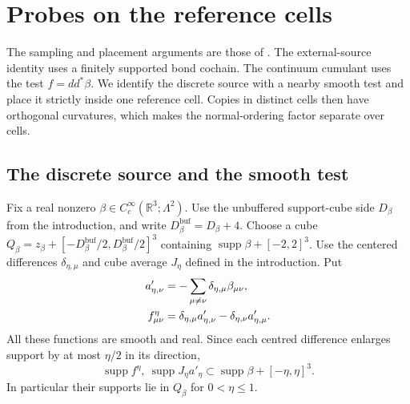 \documentclass[11pt,letterpaper,reqno]{amsart}
\newcommand{\R}{\mathbb R}
\DeclareMathOperator{\supp}{supp}
\begin{document}
\section{Probes on the reference cells}\label{sec:reference-cells}

The sampling and placement arguments are those of
\cite[\S19]{QED3Master}. The external-source identity uses a finitely supported bond cochain.
The continuum cumulant uses the test $f=dd^*\beta$. We identify the
discrete source with a nearby smooth test and place it strictly inside
one reference cell. Copies in distinct cells then have orthogonal
curvatures, which makes the normal-ordering factor separate over cells.

\subsection{The discrete source and the smooth test}

Fix a real nonzero $\beta\in C_c^\infty(\R^3;\Lambda^2)$.
Use the unbuffered support-cube side $D_\beta$ from the introduction,
and write
$D_\beta^{\mathrm{buf}}=D_\beta+4$. Choose a cube
$Q_\beta=z_\beta+[-D_\beta^{\mathrm{buf}}/2,
D_\beta^{\mathrm{buf}}/2]^3$ containing
$\supp\beta+[-2,2]^3$. Use the centered differences
$\delta_{\eta,\mu}$ and cube average $J_\eta$ defined in the introduction.
Put
\begin{align}
 a'_{\eta,\nu}&=-\sum_{\mu\ne\nu}
                          \delta_{\eta,\mu}\beta_{\mu\nu},\notag\\
 f^\eta_{\mu\nu}&=\delta_{\eta,\mu}a'_{\eta,\nu}
                         -\delta_{\eta,\nu}a'_{\eta,\mu}.
                                      \label{eq:cells-smooth-test}
\end{align}
All these functions are smooth and real. Since each centred
difference enlarges support by at most $\eta/2$ in its direction,
\[
 \supp f^\eta,\ \supp J_\eta a'_\eta
                   \subset\supp\beta+[-\eta,\eta]^3.
\]
In particular their supports lie in $Q_\beta$ for $0<\eta\le1$.
\end{document}
